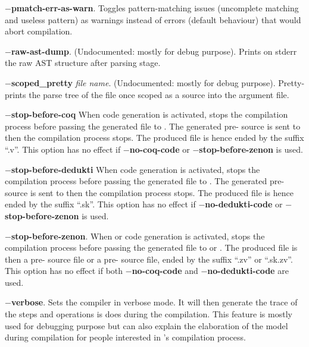 \begin{compact-itemize}
  \item[*] {\bf $-$pmatch-err-as-warn}. Toggles pattern-matching issues
    (uncomplete matching and useless pattern) as warnings instead of
    errors (default behaviour) that would abort compilation.

  \item[*] {\bf $-$raw-ast-dump}. (Undocumented: mostly for debug
    purpose). Prints on stderr the raw AST structure after parsing
    stage.

  \item[*] {\bf $-$scoped\_pretty} {\em file name}. (Undocumented:
    mostly for debug purpose). Pretty-prints the parse tree of the
    {\focal} file once scoped as a {\focal} source into the argument
    file.

  \item[*] {\bf $-$stop-before-coq} When {\coq} code generation is
    activated, stops the compilation process before passing the
    generated file to {\coq}. The generated pre-{\coq} source is sent to
    {\zenon} then the compilation process stops. The produced file is
    hence ended by the suffix ``.v''. This option has no effect if
    {\bf $-$no-coq-code} or {\bf $-$stop-before-zenon} is used.

  \item[*] {\bf $-$stop-before-dedukti} When {\dedukti} code generation is
    activated, stops the compilation process before passing the
    generated file to {\dedukti}. The generated pre-{\dedukti} source is sent to
    {\zmod} then the compilation process stops. The produced file is
    hence ended by the suffix ``.sk''. This option has no effect if
    {\bf $-$no-dedukti-code} or {\bf $-$stop-before-zenon} is used.

   \item[*] {\bf $-$stop-before-zenon}. When {\coq} or {\dedukti} code generation is
     activated, stops the compilation process before passing the
     generated file to {\zenon} or {\zmod}. The produced file is then a pre-{\coq}
     source file or a pre-{\dedukti} source file, ended by the suffix ``.zv'' or ``.sk.zv''. This option has no
     effect if both {\bf $-$no-coq-code} and {\bf $-$no-dedukti-code} are used.

  \item[*] {\bf $-$verbose}. Sets the compiler in verbose mode. It
    will then generate the trace of the steps and operations is does
    during the compilation. This feature is mostly used for debugging
    purpose but can also explain the elaboration of the model during
    compilation for people interested in {\focal}'s compilation
    process.


\end{compact-itemize}
